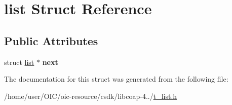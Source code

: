 \hypertarget{structlist}{}\section{list Struct Reference}
\label{structlist}
\subsection*{Public Attributes}
\begin{DoxyCompactItemize}
\item 
\hypertarget{structlist_a1900fe79e875e2838625b2eb60837f8f}{}struct \hyperlink{structlist}{list} $\ast$ {\bfseries next}\label{structlist_a1900fe79e875e2838625b2eb60837f8f}

\end{DoxyCompactItemize}


The documentation for this struct was generated from the following file\+:\begin{DoxyCompactItemize}
\item 
/home/user/\+O\+I\+C/oic-\/resource/csdk/libcoap-\/4../\hyperlink{t__list_8h}{t\+\_\+list.\+h}\end{DoxyCompactItemize}
